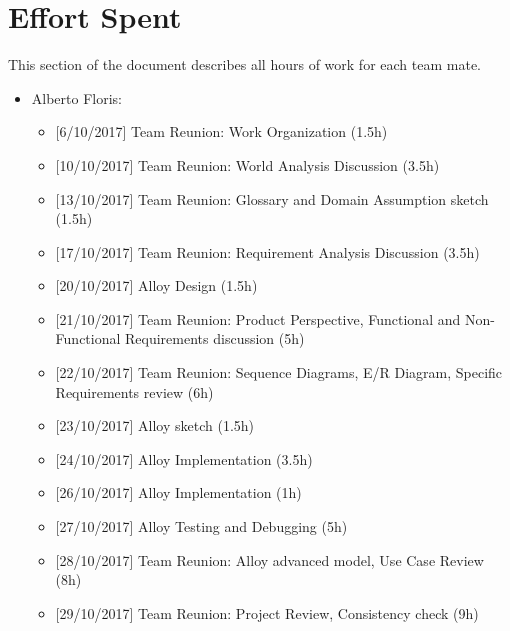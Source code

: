 \chapter{Effort Spent}

This section of the document describes all hours of work for each team mate.

\begin{itemize}

  \item Alberto Floris:
  
      \begin{itemize}
      \item {[}6/10/2017{]} Team Reunion: Work Organization (1.5h)
      \item {[}10/10/2017{]} Team Reunion: World Analysis Discussion (3.5h)
      \item {[}13/10/2017{]} Team Reunion: Glossary and Domain Assumption sketch (1.5h)
      \item {[}17/10/2017{]} Team Reunion: Requirement Analysis Discussion (3.5h)
      \item {[}20/10/2017{]} Alloy Design (1.5h)
      \item {[}21/10/2017{]} Team Reunion: Product Perspective, Functional and Non-Functional Requirements discussion (5h)
      \item {[}22/10/2017{]} Team Reunion: Sequence Diagrams, E/R Diagram, Specific Requirements review (6h)
      \item {[}23/10/2017{]} Alloy sketch (1.5h)
      \item {[}24/10/2017{]} Alloy Implementation (3.5h)
      \item {[}26/10/2017{]} Alloy Implementation (1h)
      \item {[}27/10/2017{]} Alloy Testing and Debugging (5h)     
      \item {[}28/10/2017{]} Team Reunion: Alloy advanced model, Use Case Review (8h) 
      \item {[}29/10/2017{]} Team Reunion: Project Review, Consistency check (9h) 
      \end{itemize}
      

\end{itemize}
